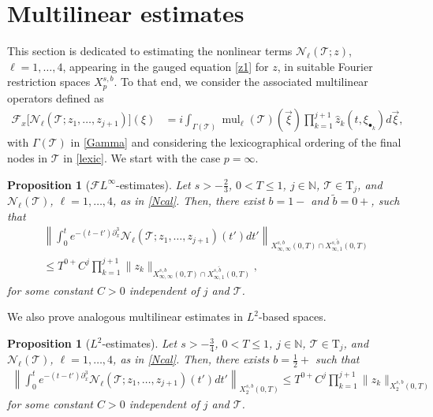 \documentclass[a4paper,
11pt,  reqno]{amsart}
\newcommand{\5}{\textup{V}}
\newcommand{\noi}{\noindent}
\newcommand{\FL}{\mathcal{F} L}
\newcommand{\ft}{\widehat}
\newcommand{\wt}{\widetilde}
\newcommand{\dx}{\partial_x}
\newtheorem{proposition}[theorem]{Proposition}
\theoremstyle{remark}
\newcommand{\bul}{\bullet}
\newcommand{\TT}{\mathcal{T}}
\newcommand{\Tr}{\mathrm{T}}
\newcommand{\G}{\Gamma}
\newcommand{\Ft}{{\mathcal{F}}}
\renewcommand{\l}{\ell}
\newcommand{\N}{\mathbb{N}}
\DeclareMathOperator{\mul}{mul}
\numberwithin{equation}{section}
\numberwithin{theorem}{section}
\newcommand{\Ncal}{\mathcal{N}}
\begin{document}
\section{Multilinear estimates}\label{sec:multi}


This section is dedicated to
estimating the nonlinear terms $\Ncal_\l(\TT;z)$, $\l=1, \ldots, 4$,  appearing in the gauged equation \eqref{z1} for $z$, in suitable Fourier restriction spaces $X^{s, b}_{p}$.
To that end, we consider the associated multilinear operators defined as
\begin{align}
\label{Ncal}
    \Ft_x\big[ \Ncal_\l (\TT; z_1, \ldots, z_{j+1} ) \big](\xi)
    &
    =
    i \int_{\G(\TT)} \mul_\l(\TT)(\vec\xi) \prod_{k=1}^{j+1} \ft{z}_k(t, \xi_{\bul_k}) d\vec\xi,
\end{align}
with $\G(\TT)$ in \eqref{Gamma} and considering the lexicographical ordering of the final nodes in $\TT$ in \eqref{lexic}.
We start with the case $p=\infty$.




\begin{proposition}[$\FL^\infty$-estimates]\label{prop:bourgLinfty}
Let $s>-\frac23$, $0< T \le 1$, $j \in\N$, $\TT \in \Tr_j$, and $\Ncal_\l(\TT)$, $\l=1,\dots, 4$, as in \eqref{Ncal}. Then, there exist
$b=1-$ and $\wt{b}=0+$, such that
	\begin{multline}
		\left\| \int_0^t e^{-(t-t')\dx^3}\Ncal_\l(\TT; z_1,\dots, z_{j+1})(t')dt'\right\|_{X^{s,b}_{\infty, \infty} (0,T)\cap X^{s,\wt b}_{\infty, 1}(0,T)}
        \\
        \le T^{0+} C^j\prod_{k=1}^{j+1}\|z_k\|_{X^{s,b}_{\infty, \infty} (0,T) \cap X^{s,\wt{b}}_{\infty,1}(0,T)}, \label{eq:Linftybourg1}
	\end{multline}
for some constant $C>0$ independent of $j$ and $\TT$.
\end{proposition}

\noi We also prove analogous multilinear estimates in $L^2$-based spaces.
\begin{proposition}[$L^2$-estimates]\label{prop:bourgL2}
Let $s>-\frac34$, $0< T \le1$, $j \in\N$, $\TT \in \Tr_j$, and $\Ncal_\l(\TT)$, $\l=1,\dots,4$, as in \eqref{Ncal}.
	Then, there exists $b=\frac12+$ such that
	\begin{align}\label{eq:bourg_bi_l2}
		\left\|\int_0^t e^{-(t-t')\dx^3} \Ncal_\l(\TT; z_1,\dots, z_{j+1})(t') dt'  \right\|_{X^{s,b}_{2}(0,T)}  \le T^{0+} C^j\prod_{k=1}^{j+1}\|z_k\|_{X^{s,b}_{2} (0,T)}
	\end{align}
    for some constant $C>0$ independent of $j$ and $\TT$.
\end{proposition}
\end{document}

